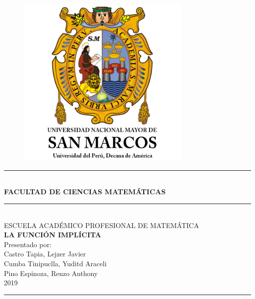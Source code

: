 \documentclass[12pt]{book}
\begin{document}
\begin{titlepage}
\begin{center}
 \begin{figure}[htb]
\begin{center}
\includegraphics[width=8.5cm]{img/unmsm.jpg}
\vspace*{0.05in}
\end{center}
\end{figure}
\rule{100mm}{0.1mm}\\
\vspace*{0.05in}
{\LARGE\textbf{FACULTAD DE CIENCIAS MATEMÁTICAS}}\\
\rule{100mm}{0.1mm}\\
\vspace*{0.20in}
{\large ESCUELA ACADÉMICO PROFESIONAL DE MATEMÁTICA}
\\
\textsf{\huge\textbf{  LA FUNCIÓN IMPLÍCITA}} \\
\vspace*{0.3in}
{\large Presentado por:}\\
\vspace*{0.3in}
{\Large Castro Tapia, Lejzer Javier\\Cumba Tinipuclla, Yuditd Araceli\\
Pino Espinoza, Renzo Anthony}
\vspace*{0.3in}\\
{\LARGE 2019}\\
\rule{80mm}{0.1mm}\\
\vspace*{0.1in}
\end{center}
\end{titlepage}
\tableofcontents





\end{document}
